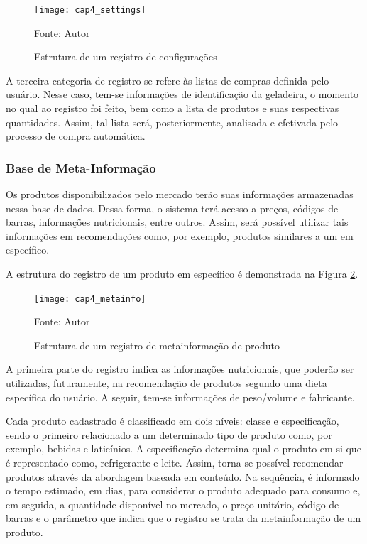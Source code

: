 \begin{figure}[htb]
    \caption{Estrutura de um registro de configurações}
    \label{fig:cap4_settings}
    \texttt{[image: cap4\_settings]}
     
    Fonte: Autor
\end{figure}

A terceira categoria de registro se refere às listas de compras definida pelo usuário. Nesse caso, tem-se informações de identificação da geladeira, o momento no qual ao registro foi feito, bem como a lista de produtos e suas respectivas quantidades. Assim, tal lista será, posteriormente, analisada e efetivada pelo processo de compra automática.



\subsubsection{Base de Meta-Informação} \label{sssec:metainfo}


Os produtos disponibilizados pelo mercado terão suas informações armazenadas nessa base de dados. Dessa forma, o sistema terá acesso a preços, códigos de barras, informações nutricionais, entre outros. Assim, será possível utilizar tais informações em recomendações como, por exemplo, produtos similares a um em específico. 

A estrutura do registro de um produto em específico é demonstrada na Figura \ref{fig:cap4_metainfo}.

\begin{figure}[htb]
    \caption{Estrutura de um registro de metainformação de produto}
    \label{fig:cap4_metainfo}
    \texttt{[image: cap4\_metainfo]}
    
    Fonte: Autor
\end{figure}

A primeira parte do registro indica as informações nutricionais, que poderão ser utilizadas, futuramente, na recomendação de produtos segundo uma dieta específica do usuário. A seguir, tem-se informações de peso/volume e fabricante.

Cada produto cadastrado é classificado em dois níveis: classe e especificação, sendo o primeiro relacionado a um determinado tipo de produto como, por exemplo, bebidas e laticínios. A especificação determina qual o produto em si que é representado como, refrigerante e leite. Assim, torna-se possível recomendar produtos através da abordagem baseada em conteúdo.
Na sequência, é informado o tempo estimado, em dias, para considerar o produto adequado para consumo e, em seguida, a quantidade disponível no mercado, o preço unitário, código de barras e o parâmetro que indica que o registro se trata da metainformação de um produto.

